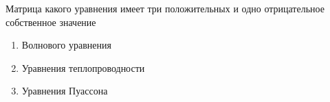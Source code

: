 Матрица какого уравнения имеет три положительных и одно отрицательное собственное значение

\begin{enumerate}[label=\arabic*)]
    \item Волнового уравнения
    \item Уравнения теплопроводности
    \item Уравнения Пуассона
\end{enumerate}

